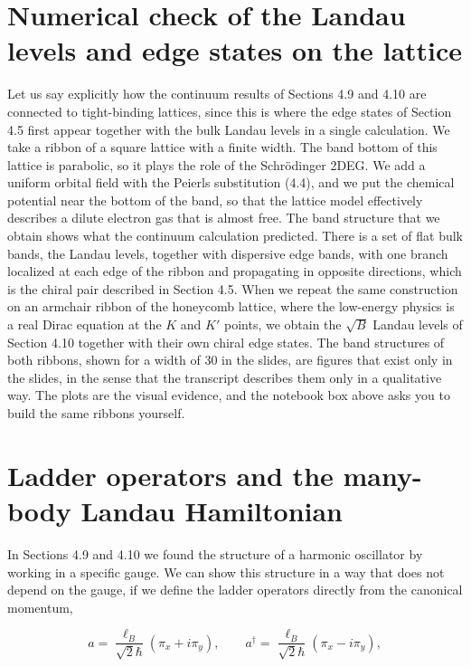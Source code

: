 \section{Numerical check of the Landau levels and edge states on the lattice}

Let us say explicitly how the continuum results of Sections 4.9 and 4.10 are connected to
tight-binding lattices, since this is where the edge states of Section 4.5 first appear together
with the bulk Landau levels in a single calculation. We take a ribbon of a square lattice with a
finite width. The band bottom of this lattice is parabolic, so it plays the role of the
Schrödinger 2DEG. We add a uniform orbital field with the Peierls substitution (4.4), and we put
the chemical potential near the bottom of the band, so that the lattice model effectively describes
a dilute electron gas that is almost free. The band structure that we obtain shows what the
continuum calculation predicted. There is a set of flat bulk bands, the Landau levels, together with
dispersive edge bands, with one branch localized at each edge of the ribbon and propagating in
opposite directions, which is the chiral pair described in Section 4.5. When we repeat the same
construction on an armchair ribbon of the honeycomb lattice, where the low-energy physics is a real
Dirac equation at the $K$ and $K'$ points, we obtain the $\sqrt{B}$ Landau levels of Section 4.10
together with their own chiral edge states. The band structures of both ribbons, shown for a width
of 30 in the slides, are figures that exist only in the slides, in the sense that the transcript
describes them only in a qualitative way. The plots are the visual evidence, and the notebook box above asks you
to build the same ribbons yourself.

\section{Ladder operators and the many-body Landau Hamiltonian}

In Sections 4.9 and 4.10 we found the structure of a harmonic oscillator by working in a specific
gauge. We can show this structure in a way that does not depend on the gauge, if we define the
ladder operators directly from the canonical momentum,

\begin{equation*}
a = \frac{\ell_B}{\sqrt{2}\hbar}(\pi_x + i\pi_y), \qquad a^\dagger = \frac{\ell_B}{\sqrt{2}\hbar}(\pi_x-i\pi_y),
\end{equation*}

